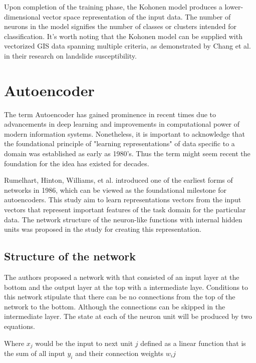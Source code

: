 \documentclass[a4paper,12pt]{Classes/RoboticsLaTeX}
\begin{document}
	Upon completion of the training phase, the Kohonen model produces a lower-dimensional vector space representation of the input data. The number of neurons in the model 
	signifies the number of classes or clusters intended for classification. It's worth noting that the Kohonen model can be supplied with vectorized GIS data spanning multiple 
	criteria, as demonstrated by Chang et al. in their research on landslide susceptibility\cite{chang2020}.

	\section{Autoencoder}

	The term Autoencoder has gained prominence in recent times due to advancements in deep learning and improvements in computational power of modern information systems. Nonetheless,
	it is important to acknowledge that the foundational principle of "learning representations" of data specific to a domain was established as early as 1980's. Thus the term might 
	seem recent the foundation for the idea has existed for decades.

	Rumelhart, Hinton, Williams, et al. introduced one of the earliest forms of networks in 1986, which can be viewed as the foundational milestone for autoencoders\cite{rumelhart1986}.
	This study aim to learn representations vectors from the input vectors that represent important features of the task domain for the particular data. The network structure of the neuron-like 
	functions with internal hidden units was proposed in the study for creating this representation.

	\subsection{Structure of the network}

	The authors proposed a network with that consisted of an input layer at the bottom and the output layer at the top with a intermediate laye. Conditions to this network
	stipulate that there can be no connections from the top of the network to the bottom. Although the connections can be skipped in the intermediate layer. The state at each of the neuron
	unit will be produced by two equations.

	Where $\textit{x}_j$ would be the input to next unit $\textit{j}$ defined as a linear function that is the sum of all input $\textit{y}_i$ and their connection weights $\textit{w}_ij$
\end{document}
